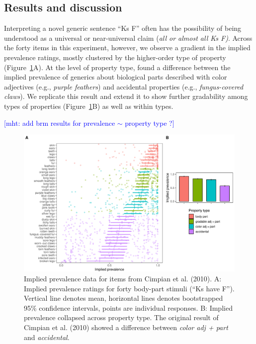 \documentclass[floatsintext,doc]{apa6}
\newcommand{\mht}[1]{{\textcolor{Blue}{[mht: #1]}}}
\begin{document}
\hypertarget{results-and-discussion}{%
\subsection{Results and discussion}\label{results-and-discussion}}

Interpreting a novel generic sentence \enquote{Ks F} often has the possibility of being understood as a universal or near-universal claim (\emph{all or almost all Ks F)}.
Across the forty items in this experiment, however, we observe a gradient in the implied prevalence ratings, mostly clustered by the higher-order type of property (Figure~\ref{fig:cimpian-modelingResults}A).
At the level of property type,  found a difference between the implied prevalence of generics about biological parts described with color adjectives (e.g., \emph{purple feathers}) and accidental properties (e.g., \emph{fungus-covered claws}).
We replicate this result and extend it to show further gradability among types of properties (Figure~\ref{fig:cimpian-modelingResults}B) as well as within types.

\mht{add brm results for prevalence $\sim$ property type ?}

\begin{figure}
\centering
\includegraphics{figs/cimpian-results}
\caption{\label{fig:cimpian-modelingResults}Implied prevalence data for items from Cimpian et al. (2010). A: Implied prevalence ratings for forty body-part stimuli (\enquote{Ks have F}). Vertical line denotes mean, horizontal lines denotes bootstrapped 95\% confidence intervals, points are individual responses. B: Implied prevalence collapsed across property type. The original result of Cimpian et al. (2010) showed a difference between \emph{color adj + part} and \emph{accidental}.}
\end{figure}
\end{document}
